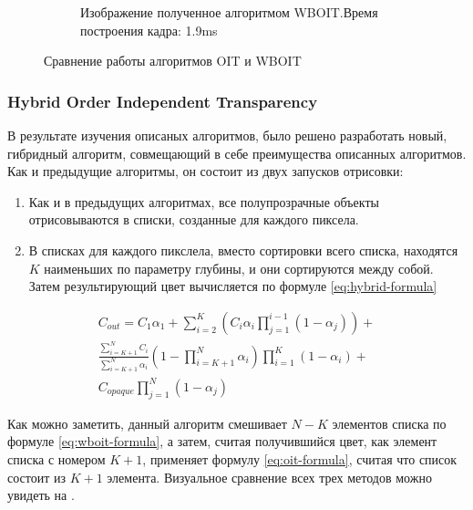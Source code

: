 \begin{figure}[!htbp]
\begin{subfigure}[b]{0.3\textwidth}
					\caption{Изображение полученное алгоритмом WBOIT.\linebreak Время построения кадра: 1.9ms}
					\label{fig:wboit_flower}
				\end{subfigure}				
				\captionsetup{justification=centering} %
				\caption{Сравнение работы алгоритмов OIT и WBOIT}\label{fig:oit_vs_wboit} 
			\end{figure}
			
		\subsubsection{Hybrid Order Independent Transparency} \label{ch3:render_pass:transparents:hybrid_oit}
			В результате изучения описаных алгоритмов, было решено разработать новый, гибридный алгоритм, совмещающий в себе преимущества описанных алгоритмов. Как и предыдущие алгоритмы, он состоит из двух запусков отрисовки:
			
			\begin{enumerate}[1.]
				\item Как и в предыдущих алгоритмах, все полупрозрачные объекты отрисовываются в списки, созданные для каждого пиксела.
				\item В списках для каждого пикслела, вместо сортировки всего списка, находятся $K$ наименьших по параметру глубины, и они сортируются между собой. Затем результирующий цвет вычисляется по формуле \ref{eq:hybrid-formula}
			\end{enumerate}
			
			\begin{equation}
				\label{eq:oit-formula}
				\begin{multlined}	 
					C_{out} = C_{1}\alpha_1 +
					\sum_{i=2}^{K}(C_i\alpha_i\prod _{j=1}^{i - 1}(1 - \alpha_j)) + \\
					\frac{\sum_{i=K+1}^{N}C_i}{\sum_{i=K+1}^{N}\alpha_i}(1 - \prod_{i=K+1}^{N}\alpha_i)\prod _{i=1}^{K}(1 - \alpha_i) + \\	
					C_{opaque}\prod _{j=1}^{N}(1 - \alpha_j)   
				\end{multlined}
			\end{equation}
			
			Как можно заметить, данный алгоритм смешивает $N-K$ элементов списка по формуле \ref{eq:wboit-formula}, а затем, считая получившийся цвет, как элемент списка с номером $K+1$, применяет формулу \ref{eq:oit-formula}, считая что список состоит из $K+1$ элемента. Визуальное сравнение всех трех методов можно увидеть на .
		
